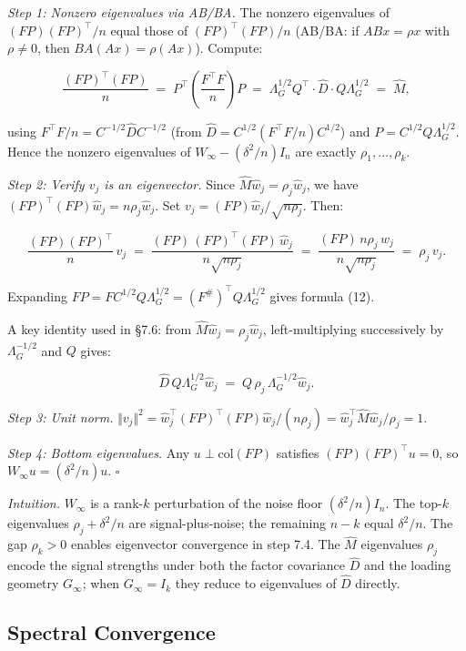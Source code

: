 \documentclass{article}
\theoremstyle{remark}
\begin{document}
\textit{Step 1: Nonzero eigenvalues via AB/BA.} The nonzero eigenvalues of $(FP)(FP)^\top/n$ equal those of $(FP)^\top(FP)/n$ (AB/BA: if $ABx = \rho x$ with $\rho\ne 0$, then $BA(Ax) = \rho(Ax)$). Compute:

\[
\frac{(FP)^\top(FP)}{n} \;=\; P^\top\!\left(\frac{F^\top F}{n}\right)P \;=\; \Lambda_G^{1/2}Q^\top\cdot\hat{D}\cdot Q\Lambda_G^{1/2} \;=\; \hat{M},
\]

using $F^\top F/n = C^{-1/2}\hat{D}C^{-1/2}$ (from $\hat{D} = C^{1/2}(F^\top F/n)C^{1/2}$) and $P = C^{1/2}Q\Lambda_G^{1/2}$. Hence the nonzero eigenvalues of $W_\infty - (\delta^2/n)I_n$ are exactly $\rho_1,\ldots,\rho_k$.

\textit{Step 2: Verify $v_j$ is an eigenvector.} Since $\hat{M}\hat{w}_j = \rho_j\hat{w}_j$, we have $(FP)^\top(FP)\hat{w}_j = n\rho_j\hat{w}_j$. Set $v_j = (FP)\hat{w}_j/\sqrt{n\rho_j}$. Then:

\[
\frac{(FP)(FP)^\top}{n}\,v_j \;=\; \frac{(FP)\,(FP)^\top(FP)\,\hat{w}_j}{n\sqrt{n\rho_j}} \;=\; \frac{(FP)\,n\rho_j\,\hat{w}_j}{n\sqrt{n\rho_j}} \;=\; \rho_j\,v_j.
\]

Expanding $FP = FC^{1/2}Q\Lambda_G^{1/2} = (F^\#)^\top Q\Lambda_G^{1/2}$ gives formula (12).

A key identity used in §7.6: from $\hat{M}\hat{w}_j = \rho_j\hat{w}_j$, left-multiplying successively by $\Lambda_G^{-1/2}$ and $Q$ gives:

\[
\hat{D}\,Q\Lambda_G^{1/2}\hat{w}_j \;=\; Q\,\rho_j\,\Lambda_G^{-1/2}\hat{w}_j. \tag{$*$}
\]

\textit{Step 3: Unit norm.} $\Vert v_j\Vert^2 = \hat{w}_j^\top(FP)^\top(FP)\hat{w}_j/(n\rho_j) = \hat{w}_j^\top\hat{M}\hat{w}_j/\rho_j = 1$.

\textit{Step 4: Bottom eigenvalues.} Any $u \perp \mathrm{col}(FP)$ satisfies $(FP)(FP)^\top u = 0$, so $W_\infty u = (\delta^2/n)u$. $\square$

\textit{Intuition.} $W_\infty$ is a rank-$k$ perturbation of the noise floor $(\delta^2/n)I_n$. The top-$k$ eigenvalues $\rho_j + \delta^2/n$ are signal-plus-noise; the remaining $n-k$ equal $\delta^2/n$. The gap $\rho_k > 0$ enables eigenvector convergence in step 7.4. The $\hat{M}$ eigenvalues $\rho_j$ encode the signal strengths under both the factor covariance $\hat{D}$ and the loading geometry $G_\infty$; when $G_\infty = I_k$ they reduce to eigenvalues of $\hat{D}$ directly.

\subsection{Spectral Convergence}
\end{document}
